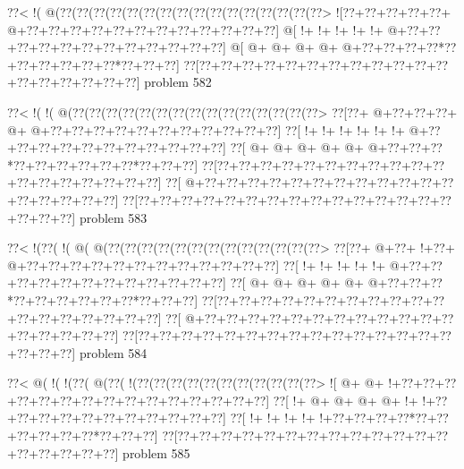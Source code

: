 \vbox{\vbox{\goo
\0??<\- !(\- @(\0??(\0??(\0??(\0??(\0??(\0??(\0??(\0??(\0??(\0??(\0??(\0??(\0??(\0??(\0??(\0??>
\- ![\0??+\0??+\0??+\0??+\0??+\- @+\0??+\0??+\0??+\0??+\0??+\0??+\0??+\0??+\0??+\0??+\0??+\0??]
\- @[\- !+\- !+\- !+\- !+\- !+\- @+\0??+\0??+\0??+\0??+\0??+\0??+\0??+\0??+\0??+\0??+\0??+\0??]
\- @[\- @+\- @+\- @+\- @+\- @+\0??+\0??+\0??+\0??*\0??+\0??+\0??+\0??+\0??+\0??*\0??+\0??+\0??]
\0??[\0??+\0??+\0??+\0??+\0??+\0??+\0??+\0??+\0??+\0??+\0??+\0??+\0??+\0??+\0??+\0??+\0??+\0??]
}
\hfil problem 582\hfil\break
}



\vbox{\vbox{\goo
\0??<\- !(\- !(\- @(\0??(\0??(\0??(\0??(\0??(\0??(\0??(\0??(\0??(\0??(\0??(\0??(\0??(\0??(\0??>
\0??[\0??+\- @+\0??+\0??+\0??+\- @+\- @+\0??+\0??+\0??+\0??+\0??+\0??+\0??+\0??+\0??+\0??+\0??]
\0??[\- !+\- !+\- !+\- !+\- !+\- !+\- @+\0??+\0??+\0??+\0??+\0??+\0??+\0??+\0??+\0??+\0??+\0??]
\0??[\- @+\- @+\- @+\- @+\- @+\- @+\0??+\0??+\0??*\0??+\0??+\0??+\0??+\0??+\0??*\0??+\0??+\0??]
\0??[\0??+\0??+\0??+\0??+\0??+\0??+\0??+\0??+\0??+\0??+\0??+\0??+\0??+\0??+\0??+\0??+\0??+\0??]
\0??[\- @+\0??+\0??+\0??+\0??+\0??+\0??+\0??+\0??+\0??+\0??+\0??+\0??+\0??+\0??+\0??+\0??+\0??]
\0??[\0??+\0??+\0??+\0??+\0??+\0??+\0??+\0??+\0??+\0??+\0??+\0??+\0??+\0??+\0??+\0??+\0??+\0??]
}
\hfil problem 583\hfil\break
}



\vbox{\vbox{\goo
\0??<\- !(\0??(\- !(\- @(\- @(\0??(\0??(\0??(\0??(\0??(\0??(\0??(\0??(\0??(\0??(\0??(\0??(\0??>
\0??[\0??+\- @+\0??+\- !+\0??+\- @+\0??+\0??+\0??+\0??+\0??+\0??+\0??+\0??+\0??+\0??+\0??+\0??]
\0??[\- !+\- !+\- !+\- !+\- !+\- @+\0??+\0??+\0??+\0??+\0??+\0??+\0??+\0??+\0??+\0??+\0??+\0??]
\0??[\- @+\- @+\- @+\- @+\- @+\- @+\0??+\0??+\0??*\0??+\0??+\0??+\0??+\0??+\0??*\0??+\0??+\0??]
\0??[\0??+\0??+\0??+\0??+\0??+\0??+\0??+\0??+\0??+\0??+\0??+\0??+\0??+\0??+\0??+\0??+\0??+\0??]
\0??[\- @+\0??+\0??+\0??+\0??+\0??+\0??+\0??+\0??+\0??+\0??+\0??+\0??+\0??+\0??+\0??+\0??+\0??]
\0??[\0??+\0??+\0??+\0??+\0??+\0??+\0??+\0??+\0??+\0??+\0??+\0??+\0??+\0??+\0??+\0??+\0??+\0??]
}
\hfil problem 584\hfil\break
}



\vbox{\vbox{\goo
\0??<\- @(\- !(\- !(\0??(\- @(\0??(\- !(\0??(\0??(\0??(\0??(\0??(\0??(\0??(\0??(\0??(\0??(\0??>
\- ![\- @+\- @+\- !+\0??+\0??+\0??+\0??+\0??+\0??+\0??+\0??+\0??+\0??+\0??+\0??+\0??+\0??+\0??]
\0??[\- !+\- @+\- @+\- @+\- @+\- !+\- !+\0??+\0??+\0??+\0??+\0??+\0??+\0??+\0??+\0??+\0??+\0??]
\0??[\- !+\- !+\- !+\- !+\- !+\0??+\0??+\0??+\0??*\0??+\0??+\0??+\0??+\0??+\0??*\0??+\0??+\0??]
\0??[\0??+\0??+\0??+\0??+\0??+\0??+\0??+\0??+\0??+\0??+\0??+\0??+\0??+\0??+\0??+\0??+\0??+\0??]
}
\hfil problem 585\hfil\break
}



